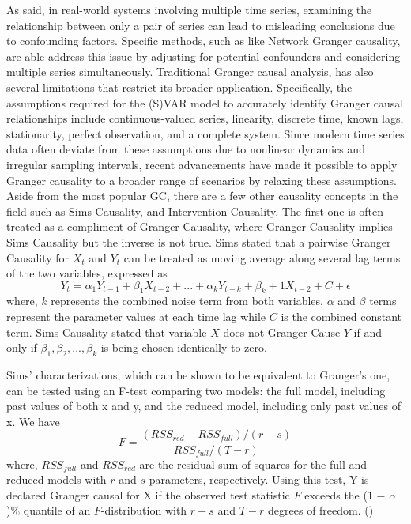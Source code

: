 As said, in real-world systems involving multiple time series, examining the relationship between only a pair of series can lead to misleading conclusions due to confounding factors. Specific methods, such as like Network Granger causality, are able address this issue by adjusting for potential confounders and considering multiple series simultaneously. Traditional Granger causal analysis, has also several limitations that restrict its broader application. Specifically, the assumptions required for the (S)VAR model to accurately identify Granger causal relationships include continuous-valued series, linearity, discrete time, known lags, stationarity, perfect observation, and a complete system. Since modern time series data often deviate from these assumptions due to nonlinear dynamics and irregular sampling intervals, recent advancements have made it possible to apply Granger causality to a broader range of scenarios by relaxing these assumptions. \cite{shojaie2022granger}\\

Aside from the most popular GC, there are a few other causality concepts in the field such as Sims Causality, and Intervention Causality. The first one is often treated as a compliment of Granger Causality, where Granger Causality implies Sims Causality but the inverse is not true. Sims stated that a pairwise Granger Causality for $X_t$ and $Y_t$ can be treated as moving average along several lag terms of the two variables, expressed as
$$Y_t = \alpha_1 Y_{t-1} + \beta_1 X_{t-2} + ... + \alpha_k Y_{t-k} + \beta_k+1 X_{t-2} + C + \epsilon$$
where, $k$ represents the combined noise term from both variables. $\alpha$ and $\beta$ terms represent the parameter values at each time lag while $C$ is the combined constant term. Sims Causality stated that variable $X$ does not Granger Cause $Y$ if and only if $\beta_1, \beta_2, ..., \beta_k$ is being chosen identically to zero.

Sims' characterizations, which can be shown to be equivalent to Granger's one, can be tested using an F-test comparing two models: the full model, including past values of both x and y, and the reduced model, including only past values of x. We have $$F = \frac{(RSS_{red} - RSS_{full})/(r-s)}{RSS_{full}/(T-r)}$$
where, $RSS_{full}$ and $RSS_{red}$ are the residual sum of squares for the full and reduced models with $r$ and $s$ parameters, respectively. Using this test, Y is declared Granger causal for X if the observed test statistic $F$ exceeds the (1 − $\alpha$)\% quantile of an $F$-distribution with $r - s$ and $T - r$ degrees of freedom. (\cite{shojaie2022granger})\\

